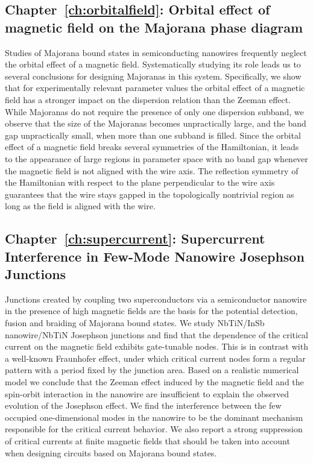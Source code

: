\subsection{Chapter~\ref{ch:orbitalfield}: Orbital effect of magnetic field on the Majorana phase diagram}
Studies of Majorana bound states in semiconducting nanowires frequently neglect the orbital effect of a magnetic field.
Systematically studying its role leads us to several conclusions for designing Majoranas in this system.
Specifically, we show that for experimentally relevant parameter values the orbital effect of a magnetic field has a stronger impact on the dispersion relation than the Zeeman effect.
While Majoranas do not require the presence of only one dispersion subband, we observe that the size of the Majoranas becomes unpractically large, and the band gap unpractically small, when more than one subband is filled.
Since the orbital effect of a magnetic field breaks several symmetries of the Hamiltonian, it leads to the appearance of large regions in parameter space with no band gap whenever the magnetic field is not aligned with the wire axis.
The reflection symmetry of the Hamiltonian with respect to the plane perpendicular to the wire axis guarantees that the wire stays gapped in the topologically nontrivial region as long as the field is aligned with the wire.
\vspace{1mm}

\subsection{Chapter~\ref{ch:supercurrent}: Supercurrent Interference in Few-Mode Nanowire Josephson Junctions}
Junctions created by coupling two superconductors via a semiconductor nanowire in the presence of high magnetic fields are the basis for the potential detection, fusion and braiding of Majorana bound states.
We study NbTiN/InSb nanowire/NbTiN Josephson junctions and find that the dependence of the critical current on the magnetic field exhibits gate-tunable nodes.
This is in contrast with a well-known Fraunhofer effect, under which critical current nodes form a regular pattern with a period fixed by the junction area.
Based on a realistic numerical model we conclude that the Zeeman effect induced by the magnetic field and the spin-orbit interaction in the nanowire are insufficient to explain the observed evolution of the Josephson effect.
We find the interference between the few occupied one-dimensional modes in the nanowire to be the dominant mechanism responsible for the critical current behavior.
We also report a strong  suppression of critical currents at finite magnetic fields that should be taken into account when designing circuits based on Majorana bound states.
\vspace{1mm}

